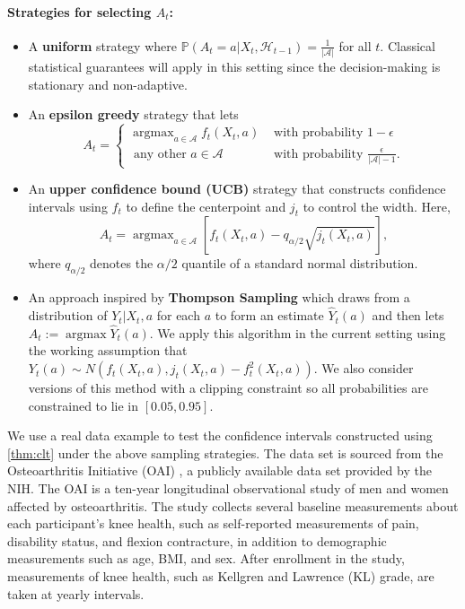 \documentclass[11pt]{article}
\DeclareMathOperator*{\argmax}{argmax}
\begin{document}
\paragraph{Strategies for selecting $A_t$:}
\begin{itemize}
    \item A \textbf{uniform} strategy where $\mathbb{P}(A_{t} = a | X_{t}, \mathcal{H}_{t-1}) = \frac{1}{|\mathcal{A}|}$ for all $t$. Classical statistical guarantees will apply in this setting since the decision-making is stationary and non-adaptive.
    \item An \textbf{epsilon greedy} strategy that lets $$A_{t} = \begin{cases} \argmax_{a \in \mathcal{A}} f_{t}(X_{t},a) &\text{ with probability } 1- \epsilon  \\ \text{ any other } a \in \mathcal{A} &\text{ with probability } \frac{ \epsilon}{|\mathcal{A}| - 1}.
\end{cases}$$
    \item An \textbf{upper confidence bound (UCB)} strategy that constructs confidence intervals using $f_{t}$ to define the centerpoint and $ j_{t}$ to control the width. Here, 
    $$A_{t} = \argmax_{a\in \mathcal{A}} \left[ f_{t}(X_{t},a) - q_{\alpha/2}\sqrt{j_{t}(X_{t},a)}\right],$$ where $q_{\alpha/2}$ denotes the $\alpha/2$ quantile of a standard normal distribution. 
    \item An approach inspired by \textbf{Thompson Sampling} which draws from a distribution of $ Y_{t} | X_{t}, a$ for each $a$ to form an estimate $\hat{Y}_{t}(a)$ and then lets $A_{t} := \argmax \hat{Y}_{t}(a)$. We apply this algorithm in the current setting using the working assumption that $Y_{t}(a) \sim N(f_{t}(X_t,a), j_{t}(X_t,a) - f_{t}^{2}(X_t,a)) $. We also consider versions of this method with a clipping constraint so all probabilities are constrained to lie in $[0.05,0.95]$. 
\end{itemize}
We use a real data example to test the confidence intervals constructed using \cref{thm:clt} under the above sampling strategies. The data set is sourced from the Osteoarthritis Initiative (OAI) \citep{nevitt2006osteoarthritis}, a publicly available data set provided by the NIH. The OAI is a ten-year longitudinal observational study of men and women affected by osteoarthritis. The study collects several baseline measurements about each participant's knee health, such as self-reported measurements of pain, disability status, and flexion contracture, in addition to demographic measurements such as age, BMI, and sex. After enrollment in the study, measurements of knee health, such as Kellgren and Lawrence (KL) grade, are taken at yearly intervals. 
\end{document}
